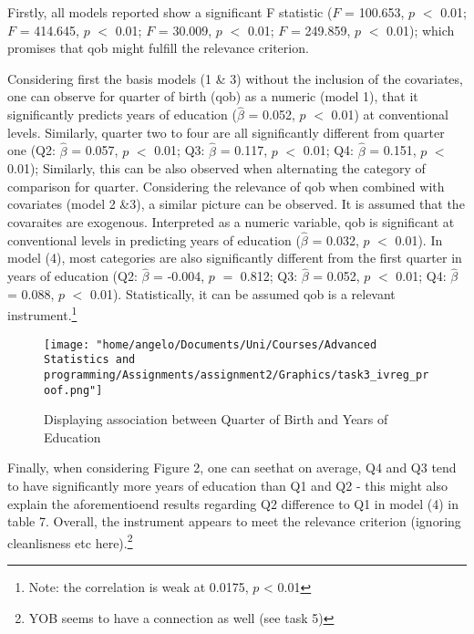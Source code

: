 \documentclass[a4paper]{article}
\begin{document}
Firstly, all models reported show a significant F statistic ($F$ = 100.653, $p$ $<$ 0.01; $F$ = 414.645, $p$ $<$ 0.01; $F$ = 30.009, $p$ $<$ 0.01; $F$ = 249.859, $p$ $<$ 0.01); which promises that qob might fulfill the relevance criterion.

Considering first the basis models (1 \& 3) without the inclusion of the covariates, one can observe for quarter of birth (qob) as a numeric (model 1), that it significantly predicts years of education ($\hat{\beta}$ = 0.052, $p$ $<$ 0.01) at conventional levels. Similarly, quarter two to four are all significantly different from quarter one (Q2: $\hat{\beta}$ = 0.057, $p$ $<$ 0.01; Q3: $\hat{\beta}$ = 0.117, $p$ $<$ 0.01; Q4: $\hat{\beta}$ = 0.151, $p$ $<$ 0.01); Similarly, this can be also  observed when alternating the category of comparison for quarter. 
Considering the relevance of qob when combined with covariates (model 2 \&3), a similar picture can be observed. It is assumed that the covaraites are exogenous. Interpreted as a numeric variable, qob is significant at conventional levels in predicting years of education ($\hat{\beta}$ = 0.032, $p$ $<$ 0.01). In model (4), most categories are also significantly different from the first quarter in years of education (Q2: $\hat{\beta}$ = -0.004, $p$ $=$ 0.812; Q3: $\hat{\beta}$ = 0.052, $p$ $<$ 0.01; Q4: $\hat{\beta}$ = 0.088, $p$ $<$ 0.01). Statistically, it can be assumed qob is a relevant instrument.\footnote{Note: the correlation is weak at 0.0175, $p$ < 0.01}

\begin{figure}[htp]
		\centering
         \texttt{[image: "home/angelo/Documents/Uni/Courses/Advanced Statistics and programming/Assignments/assignment2/Graphics/task3\_ivreg\_proof.png"]}
         \small
         \caption{Displaying association between Quarter of Birth and Years of Education}
\end{figure}

Finally, when considering Figure 2, one can seethat on average, Q4 and Q3 tend to have significantly more years of education than Q1 and Q2 - this might also explain the aforementioend results regarding Q2 difference to Q1 in model (4) in table 7. Overall, the instrument appears to meet the relevance criterion (ignoring cleanlisness etc here).\footnote{YOB seems to have a connection as well (see task 5)}
\end{document}
